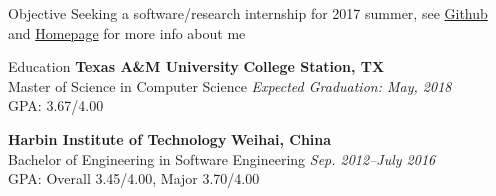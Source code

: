 \documentclass{resume} %
\begin{document}
\begin{rSection}{Objective}
Seeking a software/research internship for 2017 summer, see \href{https://github.com/vincenttsang}{Github} and \href{https://parasol.tamu.edu/~yzeng/}{Homepage} for more info about me
\end{rSection}

\begin{rSection}{Education}
{\bf Texas A\&M University} \hfill {\bf College Station, TX} 
\\ Master of Science in Computer Science \hfill {\em Expected Graduation: May, 2018}
\\ GPA: 3.67/4.00
\vspace*{-0.2em}

{\bf Harbin Institute of Technology} \hfill {\bf Weihai, China} 
\\ Bachelor of Engineering in Software Engineering \hfill {\em Sep. 2012--July 2016}
\\ GPA: Overall 3.45/4.00, Major 3.70/4.00



\end{rSection}



\end{document}
